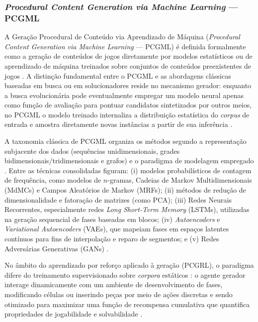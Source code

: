 \subsubsection{\textit{Procedural Content Generation via Machine Learning} --- PCGML}
\label{sec:pcgml}

A Geração Procedural de Conteúdo via Aprendizado de Máquina (\textit{Procedural Content Generation via Machine Learning} --- PCGML) é definida formalmente como a geração de conteúdos de jogos diretamente por modelos estatísticos ou de aprendizado de máquina treinados sobre conjuntos de conteúdos preexistentes de jogos \cite{summerville2018procedural}. A distinção fundamental entre o PCGML e as abordagens clássicas baseadas em busca ou em solucionadores reside no mecanismo gerador: enquanto a busca evolucionária pode eventualmente empregar um modelo neural apenas como função de avaliação para pontuar candidatos sintetizados por outros meios, no PCGML o modelo treinado internaliza a distribuição estatística do \textit{corpus} de entrada e amostra diretamente novas instâncias a partir de sua inferência \cite{summerville2018procedural}.

A taxonomia clássica de PCGML organiza os métodos segundo a representação subjacente dos dados (sequências unidimensionais, grades bidimensionais/tridimensionais e grafos) e o paradigma de modelagem empregado \cite{summerville2018procedural}. Entre as técnicas consolidadas figuram: (i) modelos probabilísticos de contagem de frequência, como modelos de $n$-gramas, Cadeias de Markov Multidimensionais (MdMCs) e Campos Aleatórios de Markov (MRFs); (ii) métodos de redução de dimensionalidade e fatoração de matrizes (como PCA); (iii) Redes Neurais Recorrentes, especialmente redes \textit{Long Short-Term Memory} (LSTMs), utilizadas na geração sequencial de fases baseadas em blocos; (iv) \textit{Autoencoders} e \textit{Variational Autoencoders} (VAEs), que mapeiam fases em espaços latentes contínuos para fins de interpolação e reparo de segmentos; e (v) Redes Adversárias Generativas (GANs) \cite{summerville2018procedural, maleki2024procedural}.

No âmbito do aprendizado por reforço aplicado à geração (PCGRL), o paradigma difere do treinamento supervisionado sobre \textit{corpora} estáticos \cite{khalifa2020pcgrl}: o agente gerador interage dinamicamente com um ambiente de desenvolvimento de fases, modificando células ou inserindo peças por meio de ações discretas e sendo otimizado para maximizar uma função de recompensa cumulativa que quantifica propriedades de jogabilidade e solvabilidade \cite{khalifa2020pcgrl, maleki2024procedural}.

